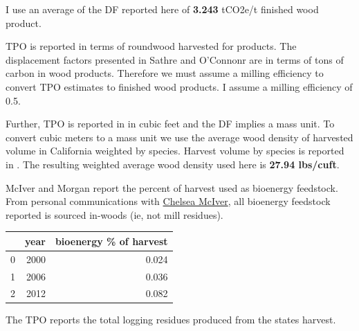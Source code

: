 \documentclass[a4paper]{article}
\begin{document}
I use an average of the DF reported here of \textbf{3.243} tCO2e/t finished
wood product.

TPO is reported in terms of roundwood harvested for products. The
displacement factors presented in Sathre and O'Connonr are in terms of
tons of carbon in wood products. Therefore we must assume a milling
efficiency to convert TPO estimates to finished wood products. I assume
a milling efficiency of 0.5.

Further, TPO is reported in in cubic feet and the DF implies a mass
unit. To convert cubic meters to a mass unit we use the average wood
density of harvested volume in California weighted by species. Harvest
volume by species is reported in \citet{Mciver2012}. The resulting weighted average wood density used here is \textbf{27.94
lbs/cuft}.

McIver and Morgan report the percent of harvest used as bioenergy
feedstock. From personal communications with
\href{http://www.bber.umt.edu/staff/mciver.asp}{Chelsea McIver}, all bioenergy feedstock reported is sourced in-woods (ie, not mill
residues).

\begin{center}
\begin{tabular}{rrr}
 & year & bioenergy \% of harvest\\
\hline
0 & 2000 & 0.024\\
1 & 2006 & 0.036\\
2 & 2012 & 0.082\\
\end{tabular}

\end{center}

The TPO reports the total logging residues produced from the states
harvest.
\end{document}
